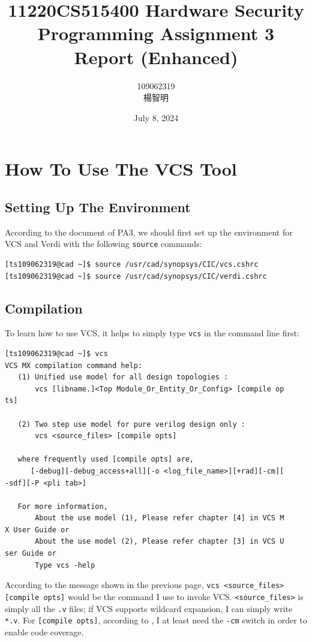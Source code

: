 \documentclass{article}
\title{11220CS515400 Hardware Security\\Programming Assignment 3 Report (Enhanced)}
\author{109062319 \begin{CJK*}{UTF8}{bkai}楊智明\end{CJK*}}
\date{July 8, 2024}
\begin{document}
\maketitle

\section{How To Use The VCS Tool}

\subsection{Setting Up The Environment}

According to the document of PA3, we should first set up the environment for VCS and Verdi with the following \verb|source| commands:

\begin{verbatim}
[ts109062319@cad ~]$ source /usr/cad/synopsys/CIC/vcs.cshrc
[ts109062319@cad ~]$ source /usr/cad/synopsys/CIC/verdi.cshrc
\end{verbatim}

\subsection{Compilation}

To learn how to use VCS, it helps to simply type \verb|vcs| in the command line first:

\begin{verbatim}
[ts109062319@cad ~]$ vcs
VCS MX compilation command help:
   (1) Unified use model for all design topologies :
       vcs [libname.]<Top Module_Or_Entity_Or_Config> [compile op
ts]

   (2) Two step use model for pure verilog design only :
       vcs <source_files> [compile opts]

   where frequently used [compile opts] are,
      [-debug][-debug_access+all][-o <log_file_name>][+rad][-cm][
-sdf][-P <pli tab>]

   For more information,
       About the use model (1), Please refer chapter [4] in VCS M
X User Guide or
       About the use model (2), Please refer chapter [3] in VCS U
ser Guide or
       Type vcs -help
\end{verbatim}

According to the message shown in the previous page, \verb|vcs <source_files>|\\\verb|[compile opts]| would be the command I use to invoke VCS. \verb|<source_files>| is simply all the \verb|.v| files; if VCS supports wildcard expansion, I can simply write \verb|*.v|. For \verb|[compile opts]|, according to \cite{csdnverdicov}, I at least need the \verb|-cm| switch in order to enable code coverage.
\end{document}
